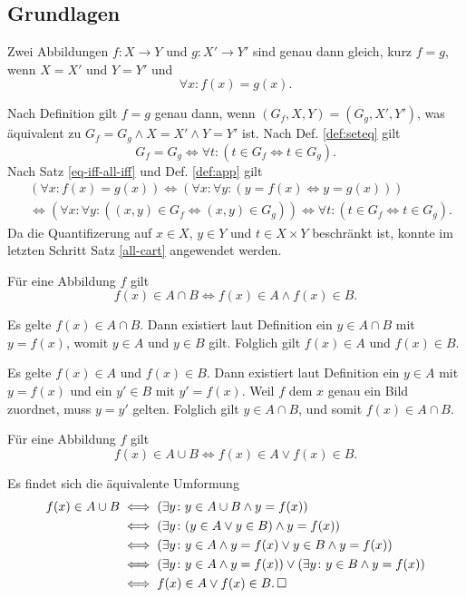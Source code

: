 \subsection{Grundlagen}
\begin{Satz}%
\label{feq}
Zwei Abbildungen $f\colon X\to Y$ und $g\colon X'\to Y'$ sind genau
dann gleich, kurz $f=g$, wenn $X=X'$ und $Y=Y'$ und%
\[\forall x\colon f(x)=g(x).\]
\end{Satz}

\begin{Beweis}
Nach Definition gilt $f=g$ genau dann, wenn $(G_f,X,Y)=(G_g,X',Y')$,
was äquivalent zu $G_f=G_g\land X=X'\land Y=Y'$ ist. Nach Def.
\ref{def:seteq} gilt%
\[G_f=G_g\iff \forall t\colon (t\in G_f\Leftrightarrow t\in G_g).\]
Nach Satz \ref{eq-iff-all-iff} und Def. \ref{def:app} gilt
\begin{align*}
&(\forall x\colon f(x)=g(x)) \iff (\forall x\colon\forall y\colon (y=f(x)\Leftrightarrow y=g(x)))\\
&\iff (\forall x\colon\forall y\colon((x,y)\in G_f\Leftrightarrow (x,y)\in G_g))
\iff \forall t\colon (t\in G_f\Leftrightarrow t\in G_g).
\end{align*}
Da die Quantifizerung auf $x\in X$, $y\in Y$ und $t\in X\times Y$
beschränkt ist, konnte im letzten Schritt Satz \ref{all-cart}
angewendet werden.\;\qedsymbol
\end{Beweis}

\begin{Satz} Für eine Abbildung $f$ gilt
\[f(x)\in A\cap B\iff f(x)\in A\land f(x)\in B.\]
\end{Satz}
\begin{Beweis}
Es gelte $f(x)\in A\cap B$. Dann existiert laut Definition ein
$y\in A\cap B$ mit $y=f(x)$, womit $y\in A$ und $y\in B$ gilt.
Folglich gilt $f(x)\in A$ und $f(x)\in B$.

Es gelte $f(x)\in A$ und $f(x)\in B$. Dann existiert laut Definition
ein $y\in A$ mit $y=f(x)$ und ein $y'\in B$ mit $y'=f(x)$.
Weil $f$ dem $x$ genau ein Bild zuordnet, muss $y=y'$ gelten.
Folglich gilt $y\in A\cap B$, und somit $f(x)\in A\cap B$.\,\qedsymbol
\end{Beweis}

\begin{Satz} Für eine Abbildung $f$ gilt
\[f(x)\in A\cup B\iff f(x)\in A\lor f(x)\in B.\]
\end{Satz}
\begin{Beweis} Es findet sich die äquivalente Umformung
\begin{align*}
f(x)\in A\cup B &\iff (\exists y\colon y\in A\cup B\land y=f(x))\\
&\iff (\exists y\colon (y\in A\lor y\in B)\land y = f(x))\\
&\iff (\exists y\colon y\in A\land y=f(x)\lor y\in B\land y = f(x))\\
&\iff (\exists y\colon y\in A\land y=f(x))\lor (\exists y\colon y\in B\land y = f(x))\\
&\iff f(x)\in A\lor f(x)\in B.\,\square
\end{align*}
\end{Beweis}

